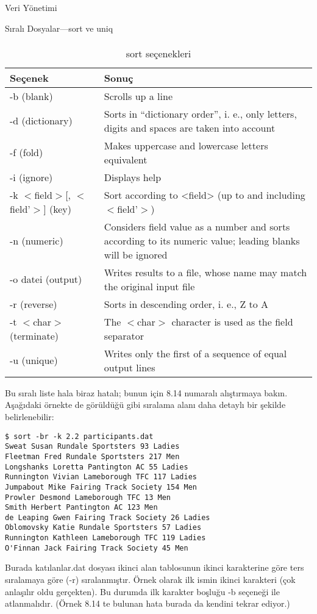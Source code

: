 \begin{section}{Veri Yönetimi}
\begin{subsection}{Sıralı Dosyalar—sort ve uniq}
\paragraph{}{
\begin {table}[H]
\caption {sort seçenekleri} \label{tab:tablo83} 
\begin{tabular}{l l}
\hline
Seçenek & Sonuç\\
\hline
-b (blank) & Scrolls up a line\\
-d (dictionary) & Sorts in “dictionary order”, i. e., only letters, digits and spaces are taken into account\\
-f (fold) & Makes uppercase and lowercase letters equivalent\\
-i (ignore) & Displays help \\
-k $<$field$>$[, $<$field’$>$] (key) & Sort according to <field> (up to and including $<$field’$>$) \\
-n (numeric) & Considers field value as a number and sorts according to its numeric value; leading blanks will be ignored\\
-o datei (output) & Writes results to a file, whose name may match the original input file\\
-r (reverse) & Sorts in descending order, i. e., Z to A\\
-t $<$char$>$ (terminate) & The $<$char$>$ character is used as the field separator\\
-u (unique) & Writes only the first of a sequence of equal output lines\\
\hline
\end{tabular}
\end {table}}

Bu sıralı liste hala biraz hatalı; bunun için 8.14 numaralı alıştırmaya bakın. 
Aşağıdaki örnekte de görüldüğü gibi sıralama alanı daha detaylı bir şekilde belirlenebilir:
\begin{verbatim}
$ sort -br -k 2.2 participants.dat
Sweat Susan Rundale Sportsters 93 Ladies
Fleetman Fred Rundale Sportsters 217 Men
Longshanks Loretta Pantington AC 55 Ladies
Runnington Vivian Lameborough TFC 117 Ladies
Jumpabout Mike Fairing Track Society 154 Men
Prowler Desmond Lameborough TFC 13 Men
Smith Herbert Pantington AC 123 Men
de Leaping Gwen Fairing Track Society 26 Ladies
Oblomovsky Katie Rundale Sportsters 57 Ladies
Runnington Kathleen Lameborough TFC 119 Ladies
O'Finnan Jack Fairing Track Society 45 Men
\end{verbatim}

Burada katılanlar.dat dosyası ikinci alan tablosunun ikinci karakterine göre ters sıralamaya göre (-r) sıralanmıştır. Örnek olarak ilk ismin ikinci karakteri (çok anlaşılır oldu gerçekten). Bu durumda ilk karakter boşluğu -b seçeneği ile atlanmalıdır. (Örnek 8.14 te bulunan hata burada da kendini tekrar ediyor.) 


\end{subsection}
\end{section}
